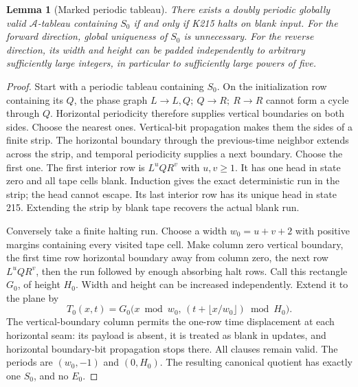 \documentclass[11pt,a4paper]{article}
\newtheorem{lemma}[theorem]{Lemma}
\theoremstyle{definition}
\theoremstyle{remark}
\begin{document}
\begin{lemma}[Marked periodic tableau]\label{lem:tableau}
There exists a doubly periodic globally valid \(\mathcal A\)-tableau
containing \(S_0\) if and only if K215 halts on blank input.
For the forward direction, global uniqueness of \(S_0\) is unnecessary.
For the reverse direction, its width and height can be padded
independently to arbitrary sufficiently large integers, in particular
to sufficiently large powers of five.
\end{lemma}
\begin{proof}
Start with a periodic tableau containing \(S_0\).
On the initialization row containing its \(Q\), the phase graph
\(L\to L,Q;\ Q\to R;\ R\to R\) cannot form a cycle through \(Q\).
Horizontal periodicity therefore supplies vertical boundaries on both
sides. Choose the nearest ones. Vertical-bit propagation makes them
the sides of a finite strip. The horizontal boundary through the
previous-time neighbor extends across the strip, and temporal
periodicity supplies a next boundary. Choose the first one.
The first interior row is \(L^uQR^v\) with \(u,v\ge1\).
It has one head in state zero and all tape cells blank.
Induction gives the exact deterministic run in the strip; the head
cannot escape. Its last interior row has its unique head in state
215. Extending the strip by blank tape recovers the actual blank run.

Conversely take a finite halting run. Choose a width \(w_0=u+v+2\)
with positive margins containing every visited tape cell. Make
column zero vertical boundary, the first time row horizontal boundary
away from column zero, the next row \(L^uQR^v\), then the run followed
by enough absorbing halt rows. Call this rectangle \(G_0\), of height
\(H_0\). Width and height can be increased independently.
Extend it to the plane by
\[
 T_0(x,t)=G_0\bigl(x\bmod w_0,\,
                   (t+\lfloor x/w_0\rfloor)\bmod H_0\bigr).
 \tag{12}
\]
The vertical-boundary column permits the one-row time displacement
at each horizontal seam: its payload is absent, it is treated as
blank in updates, and horizontal boundary-bit propagation stops there.
All clauses remain valid. The periods are \((w_0,-1)\) and \((0,H_0)\).
The resulting canonical quotient has exactly one \(S_0\), and no
\(E_0\).
\end{proof}
\end{document}
